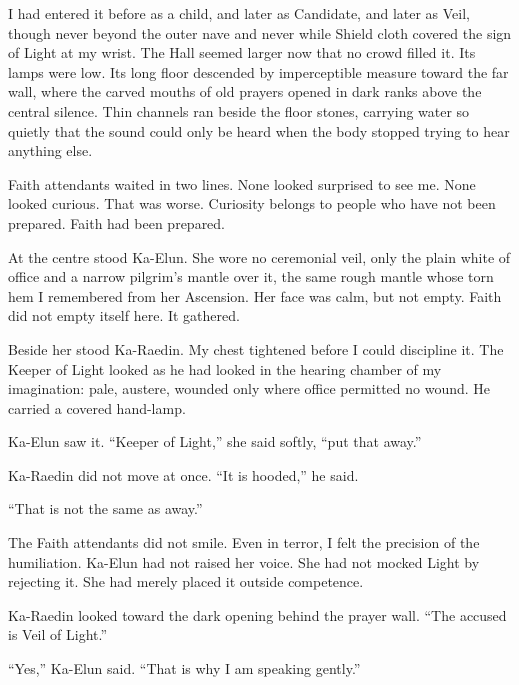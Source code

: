 I had entered it before as a child, and later as Candidate, and later as Veil, though never beyond the outer nave and never while Shield cloth covered the sign of Light at my wrist. The Hall seemed larger now that no crowd filled it. Its lamps were low. Its long floor descended by imperceptible measure toward the far wall, where the carved mouths of old prayers opened in dark ranks above the central silence. Thin channels ran beside the floor stones, carrying water so quietly that the sound could only be heard when the body stopped trying to hear anything else.\par

Faith attendants waited in two lines. None looked surprised to see me. None looked curious. That was worse. Curiosity belongs to people who have not been prepared. Faith had been prepared.\par

At the centre stood Ka-Elun. She wore no ceremonial veil, only the plain white of office and a narrow pilgrim's mantle over it, the same rough mantle whose torn hem I remembered from her Ascension. Her face was calm, but not empty. Faith did not empty itself here. It gathered.\par

Beside her stood Ka-Raedin. My chest tightened before I could discipline it. The Keeper of Light looked as he had looked in the hearing chamber of my imagination: pale, austere, wounded only where office permitted no wound. He carried a covered hand-lamp.\par

Ka-Elun saw it. ``Keeper of Light,'' she said softly, ``put that away.''\par

Ka-Raedin did not move at once. ``It is hooded,'' he said.\par

``That is not the same as away.''\par

The Faith attendants did not smile. Even in terror, I felt the precision of the humiliation. Ka-Elun had not raised her voice. She had not mocked Light by rejecting it. She had merely placed it outside competence.\par

Ka-Raedin looked toward the dark opening behind the prayer wall. ``The accused is Veil of Light.''\par

``Yes,'' Ka-Elun said. ``That is why I am speaking gently.''\par

